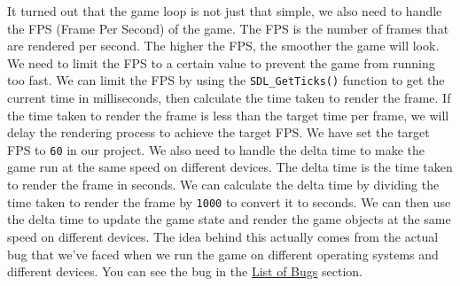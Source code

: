 \hspace{1cm} It turned out that the game loop is not just that simple, we also need to handle the FPS (Frame Per Second) of the game. The FPS is the number of frames that are rendered per second. The higher the FPS, the smoother the game will look. We need to limit the FPS to a certain value to prevent the game from running too fast. We can limit the FPS by using the \texttt{SDL\_GetTicks()} function to get the current time in milliseconds, then calculate the time taken to render the frame. If the time taken to render the frame is less than the target time per frame, we will delay the rendering process to achieve the target FPS. We have set the target FPS to \texttt{60} in our project. We also need to handle the delta time to make the game run at the same speed on different devices. The delta time is the time taken to render the frame in seconds. We can calculate the delta time by dividing the time taken to render the frame by \texttt{1000} to convert it to seconds. We can then use the delta time to update the game state and render the game objects at the same speed on different devices. The idea behind this actually comes from the actual bug that we've faced when we run the game on different operating systems and different devices. You can see the bug in the \hyperref[sec:bugs-list]{List of Bugs} section.

